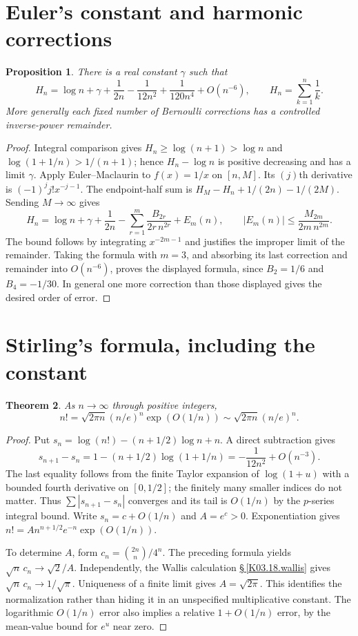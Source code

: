 \documentclass[11pt,oneside,a4paper]{book}
\newtheorem{theorem}{Theorem}[chapter]
\newtheorem{proposition}[theorem]{Proposition}
\theoremstyle{definition}
\theoremstyle{remark}
\newcommand{\KEntry}[2]{\Needspace{7\baselineskip}\section{#2}\label{#1}{\small\sffamily\color{black!60}\detokenize{#1}}\par}
\newcommand{\KRef}[1]{\hyperref[#1]{\S\,\ref*{#1}}}
\begin{document}
\KEntry{K03.17.harmonic}{Euler's constant and harmonic corrections}
\begin{proposition}
There is a real constant $\gamma$ such that
\[
 H_n=\log n+\gamma+\frac1{2n}-\frac1{12n^2}
       +\frac1{120n^4}+O(n^{-6}),\qquad H_n=\sum_{k=1}^n\frac1k.
\]
More generally each fixed number of Bernoulli corrections has a controlled
inverse-power remainder.
\end{proposition}
\begin{proof}
Integral comparison gives $H_n\geq\log(n+1)>\log n$ and
$\log(1+1/n)>1/(n+1)$; hence $H_n-\log n$ is positive decreasing and has
a limit $\gamma$. Apply Euler--Maclaurin to $f(x)=1/x$ on $[n,M]$.
Its $(j)$th derivative is $(-1)^jj!x^{-j-1}$. The endpoint-half sum is
$H_M-H_n+1/(2n)-1/(2M)$. Sending $M\to\infty$ gives
\[
 H_n=\log n+\gamma+\frac1{2n}
 -\sum_{r=1}^m\frac{B_{2r}}{2r\,n^{2r}}+E_m(n),
 \qquad |E_m(n)|\leq\frac{M_{2m}}{2m\,n^{2m}}.
\]
The bound follows by integrating $x^{-2m-1}$ and justifies the improper
limit of the remainder. Taking the formula with $m=3$, and absorbing its
last correction and remainder into $O(n^{-6})$, proves the displayed
formula, since $B_2=1/6$ and $B_4=-1/30$. In general one more correction
than those displayed gives the desired order of error.
\end{proof}

\KEntry{K03.17.stirling}{Stirling's formula, including the constant}
\begin{theorem}
As $n\to\infty$ through positive integers,
\[
 n!=\sqrt{2\pi n}(n/e)^n\exp(O(1/n))
     \sim\sqrt{2\pi n}(n/e)^n.
\]
\end{theorem}
\begin{proof}
Put $s_n=\log(n!)-(n+1/2)\log n+n$. A direct subtraction gives
\[
 s_{n+1}-s_n=1-(n+1/2)\log(1+1/n)
            =-\frac1{12n^2}+O(n^{-3}).
\]
The last equality follows from the finite Taylor expansion of $\log(1+u)$
with a bounded fourth derivative on $[0,1/2]$; the finitely many smaller
indices do not matter. Thus $\sum|s_{n+1}-s_n|$ converges and its tail is
$O(1/n)$ by the $p$-series integral bound. Write $s_n=c+O(1/n)$ and
$A=e^c>0$. Exponentiation gives
$n!=A n^{n+1/2}e^{-n}\exp(O(1/n))$.

To determine $A$, form $c_n=\binom{2n}{n}/4^n$. The preceding formula yields
$\sqrt n\,c_n\to\sqrt2/A$. Independently, the Wallis calculation
\KRef{K03.18.wallis} gives $\sqrt n\,c_n\to1/\sqrt\pi$.
Uniqueness of a finite limit gives $A=\sqrt{2\pi}$. This identifies the
normalization rather than hiding it in an unspecified multiplicative constant.
The logarithmic $O(1/n)$ error also implies a relative $1+O(1/n)$ error,
by the mean-value bound for $e^u$ near zero.
\end{proof}
\end{document}
